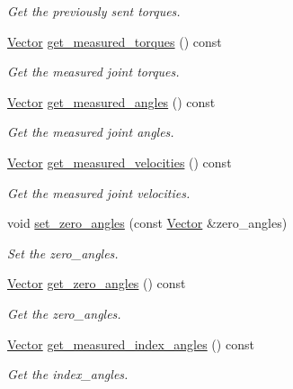 \begin{DoxyCompactItemize}
\begin{DoxyCompactList}\small\item\em Get the previously sent torques. \end{DoxyCompactList}\item 
\hyperlink{classblmc__robots_1_1SpiJointModules_a2d48f81ec41a42a240e80cd22d4fa2f8}{Vector} \hyperlink{classblmc__robots_1_1SpiJointModules_ae244269604abea4bff4c1199820e36a5}{get\+\_\+measured\+\_\+torques} () const
\begin{DoxyCompactList}\small\item\em Get the measured joint torques. \end{DoxyCompactList}\item 
\hyperlink{classblmc__robots_1_1SpiJointModules_a2d48f81ec41a42a240e80cd22d4fa2f8}{Vector} \hyperlink{classblmc__robots_1_1SpiJointModules_a5e15bdf82a46aeddc671eb843f181459}{get\+\_\+measured\+\_\+angles} () const
\begin{DoxyCompactList}\small\item\em Get the measured joint angles. \end{DoxyCompactList}\item 
\hyperlink{classblmc__robots_1_1SpiJointModules_a2d48f81ec41a42a240e80cd22d4fa2f8}{Vector} \hyperlink{classblmc__robots_1_1SpiJointModules_a3857a40c65dda1200c37a7f58e87fc6b}{get\+\_\+measured\+\_\+velocities} () const
\begin{DoxyCompactList}\small\item\em Get the measured joint velocities. \end{DoxyCompactList}\item 
void \hyperlink{classblmc__robots_1_1SpiJointModules_a9b6c71b98d4738e1167daf1baa443400}{set\+\_\+zero\+\_\+angles} (const \hyperlink{classblmc__robots_1_1SpiJointModules_a2d48f81ec41a42a240e80cd22d4fa2f8}{Vector} \&zero\+\_\+angles)
\begin{DoxyCompactList}\small\item\em Set the zero\+\_\+angles. \end{DoxyCompactList}\item 
\hyperlink{classblmc__robots_1_1SpiJointModules_a2d48f81ec41a42a240e80cd22d4fa2f8}{Vector} \hyperlink{classblmc__robots_1_1SpiJointModules_a601fccbb1fda008282729b7bd1cf2e08}{get\+\_\+zero\+\_\+angles} () const
\begin{DoxyCompactList}\small\item\em Get the zero\+\_\+angles. \end{DoxyCompactList}\item 
\hyperlink{classblmc__robots_1_1SpiJointModules_a2d48f81ec41a42a240e80cd22d4fa2f8}{Vector} \hyperlink{classblmc__robots_1_1SpiJointModules_ac4dff8f20dee3d73d8885f8f2d6fc141}{get\+\_\+measured\+\_\+index\+\_\+angles} () const
\begin{DoxyCompactList}\small\item\em Get the index\+\_\+angles. \end{DoxyCompactList}\end{DoxyCompactItemize}
